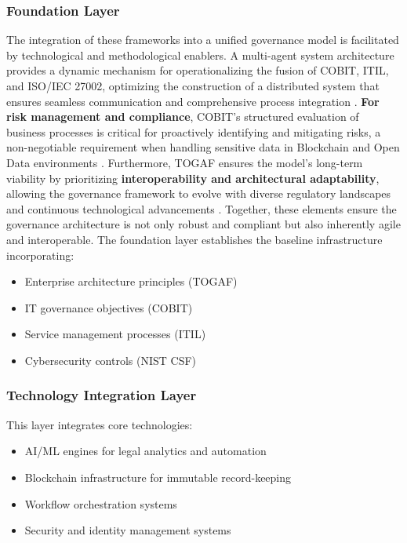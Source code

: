 \documentclass{IET-Conf-Paper}
\begin{document}
    \subsubsection{\textbf{Foundation Layer}}
        The integration of these frameworks into a unified governance model is facilitated by technological and methodological enablers. A multi-agent system architecture provides a dynamic mechanism for operationalizing the fusion of COBIT, ITIL, and ISO/IEC 27002, optimizing the construction of a distributed system that ensures seamless communication and comprehensive process integration \cite{Soukaina_Elhasnaoui_2014}. \textbf{For risk management and compliance}, COBIT's structured evaluation of business processes is critical for proactively identifying and mitigating risks, a non-negotiable requirement when handling sensitive data in Blockchain and Open Data environments \cite{T_I_Fajri_2024}. Furthermore, TOGAF ensures the model's long-term viability by prioritizing \textbf{interoperability and architectural adaptability}, allowing the governance framework to evolve with diverse regulatory landscapes and continuous technological advancements \cite{Andreas_Schmitz_2022}. Together, these elements ensure the governance architecture is not only robust and compliant but also inherently agile and interoperable. The foundation layer establishes the baseline infrastructure incorporating:
        \begin{itemize}
        \item Enterprise architecture principles (TOGAF)
        \item IT governance objectives (COBIT)
        \item Service management processes (ITIL)
        \item Cybersecurity controls (NIST CSF)
        \end{itemize}

    \subsubsection{\textbf{Technology Integration Layer}}
        This layer integrates core technologies:
        \begin{itemize}
        \item AI/ML engines for legal analytics and automation
        \item Blockchain infrastructure for immutable record-keeping
        \item Workflow orchestration systems
        \item Security and identity management systems
        \end{itemize}
\end{document}
